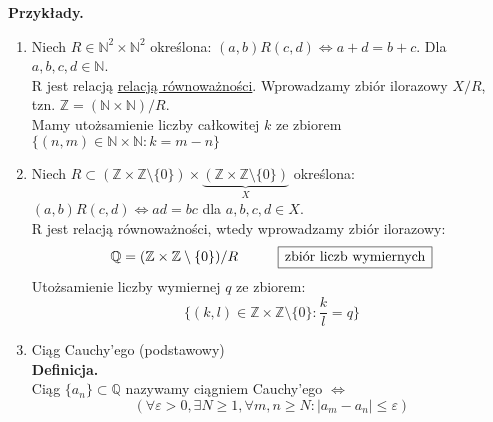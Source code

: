 \documentclass[a5paper,8pt]{article}
\theoremstyle{mythmstyle}
\newcommand\tab[1][1cm]{\hspace*{#1}}
\begin{document}
            \textbf{Przykłady.}

            \begin{enumerate}
                \item Niech $ R \in \mathbb{N}^2 \times \mathbb{N}^2 $ określona:
                $ (a, b) R (c, d) \iff a + d = b + c $. Dla $a, b, c, d \in \mathbb{N} $.\\

                R jest relacją \underline{relacją równoważności}. Wprowadzamy zbiór ilorazowy
                $ X/R $, tzn. $ \mathbb{Z} = (\mathbb{N} \times \mathbb{N} ) / R $. \\

                Mamy utożsamienie liczby całkowitej $k$ ze zbiorem\\ $ \{(n, m) \in \mathbb{N} \times \mathbb{N} : k = m - n \} $

                \item Niech $R \subset (\mathbb{Z} \times \mathbb{Z} \setminus \{0\}) \times
                \underbrace{(\mathbb{Z} \times \mathbb{Z} \setminus \{0\})}_X $ określona: \\
                $(a, b) R (c, d) \iff ad = bc $ dla $ a, b, c, d \in X $.\\

                R jest relacją równoważności, wtedy wprowadzamy zbiór ilorazowy:
                \begin{equation*}
                    \mathbb{Q} = (\mathbb{Z} \times \mathbb{Z} \setminus \{0\}) / R \tab \framebox[1.1\width]{zbiór liczb wymiernych}
                \end{equation*}
                Utożsamienie liczby wymiernej $ q $ ze zbiorem:
                \begin{equation*}
                    \{ (k, l) \in \mathbb{Z} \times \mathbb{Z} \setminus \{0\} : \frac{k}{l} = q \}
                \end{equation*}

                \item Ciąg Cauchy'ego (podstawowy) \\
                \textbf{Definicja.} \\
                Ciąg $ \{a_n\} \subset \mathbb{Q} $ nazywamy ciągniem Cauchy'ego $\iff$
                \begin{equation*}
                    (\forall \varepsilon > 0, \exists N \geq 1, \forall m, n \geq N : |a_m - a_n| \leq \varepsilon)
                \end{equation*}


\end{enumerate}
\end{document}
